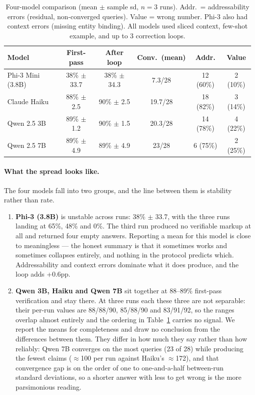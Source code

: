 \documentclass[11pt,a4paper]{article}
\begin{document}
\begin{table}[h]
\centering
\small
\begin{tabular}{lccccc}
\toprule
\textbf{Model} & \textbf{First-pass} & \textbf{After loop} & \textbf{Conv.\ (mean)} & \textbf{Addr.} & \textbf{Value} \\
\midrule
Phi-3 Mini (3.8B) & 38\% $\pm$ 33.7 & 38\% $\pm$ 34.3 & 7.3/28 & 12 (60\%) & 2 (10\%) \\
Claude Haiku & 88\% $\pm$ 2.5 & 90\% $\pm$ 2.5 & 19.7/28 & 18 (82\%) & 3 (14\%) \\
Qwen 2.5 3B & 89\% $\pm$ 1.2 & 90\% $\pm$ 1.5 & 20.3/28 & 14 (78\%) & 4 (22\%) \\
Qwen 2.5 7B & 89\% $\pm$ 4.9 & 89\% $\pm$ 4.9 & 23/28 & 6 (75\%) & 2 (25\%) \\
\bottomrule
\end{tabular}
\caption{Four-model comparison (mean $\pm$ sample sd, $n{=}3$ runs). Addr.\ = addressability errors (residual, non-converged queries). Value = wrong number. Phi-3 also had context errors (missing entity binding). All models used sliced context, few-shot example, and up to 3 correction loops.}
\label{tab:capability}
\end{table}

\paragraph{What the spread looks like.} The four models fall into two groups, and the line between them is stability rather than rate.

\begin{enumerate}
    \item \textbf{Phi-3 (3.8B)} is unstable across runs: 38\% $\pm$ 33.7, with the three runs landing at 65\%, 48\% and 0\%. The third run produced no verifiable markup at all and returned four empty answers. Reporting a mean for this model is close to meaningless --- the honest summary is that it sometimes works and sometimes collapses entirely, and nothing in the protocol predicts which. Addressability and context errors dominate what it does produce, and the loop adds +0.6pp.
    \item \textbf{Qwen 3B, Haiku and Qwen 7B} sit together at 88--89\% first-pass verification and stay there. At three runs each these three are not separable: their per-run values are 88/88/90, 85/88/90 and 83/91/92, so the ranges overlap almost entirely and the ordering in Table~\ref{tab:capability} carries no signal. We report the means for completeness and draw no conclusion from the differences between them. They differ in how much they say rather than how reliably: Qwen 7B converges on the most queries (23 of 28) while producing the fewest claims ($\approx$100 per run against Haiku's $\approx$172), and that convergence gap is on the order of one to one-and-a-half between-run standard deviations, so a shorter answer with less to get wrong is the more parsimonious reading.
\end{enumerate}
\end{document}
